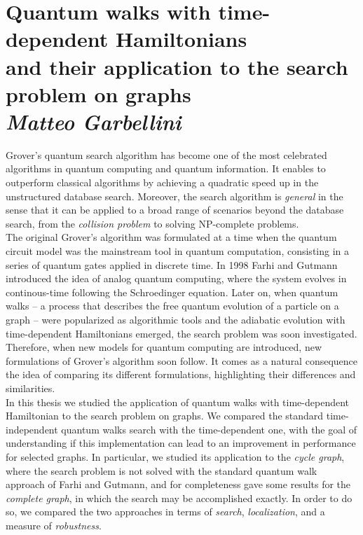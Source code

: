 \documentclass[11pt, twoside]{report}
\begin{document}
\vspace{-4cm}
\onehalfspacing
\section*{\centering Quantum walks with time-dependent Hamiltonians \\and their application to the search problem on graphs \\ \textit{\normalfont \normalsize \textit{Matteo Garbellini}}}



Grover's quantum search algorithm has become one of the most celebrated algorithms in quantum computing and quantum information. It enables to outperform classical algorithms by achieving a quadratic speed up in the unstructured database search. Moreover, the search algorithm is \textit{general} in the sense that it can be applied to a broad range of scenarios beyond the database search, from the \textit{collision problem} to solving  NP-complete problems.\\

The original Grover's algorithm was formulated at a time when the quantum circuit model was the mainstream tool in quantum computation, consisting in a series of quantum gates applied in discrete time. In 1998 Farhi and Gutmann introduced the idea of analog quantum computing, where the system evolves in continous-time following the Schroedinger equation. Later on, when quantum walks -- a process that describes the free quantum evolution of a particle on a graph -- were popularized as algorithmic tools and the adiabatic evolution with time-dependent Hamiltonians emerged, the search problem was soon investigated. Therefore, when new models for quantum computing are introduced, new formulations of Grover's algorithm soon follow. It comes as a natural consequence the idea of comparing its different formulations, highlighting their differences and similarities. \\

In this thesis we studied the application of quantum walks with time-dependent Hamiltonian to the search problem on graphs. We compared the standard time-independent quantum walks search with the time-dependent one, with the goal of understanding if this implementation can lead to an improvement in performance for selected graphs. In particular, we studied its application to the \textit{cycle graph}, where the search problem is not solved with the standard quantum walk approach of Farhi and Gutmann, and for completeness gave some results for the \textit{complete graph}, in which the search may be accomplished exactly. In order to do so, we compared the two approaches in terms of \textit{search}, \textit{localization}, and a measure of \textit{robustness}. 
\end{document}
